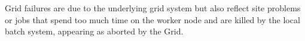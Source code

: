 Grid failures are due to the underlying grid system but also reflect site problems or jobs that spend too much time on the worker node and are killed by the local batch system, appearing as aborted by the Grid.


%
%
